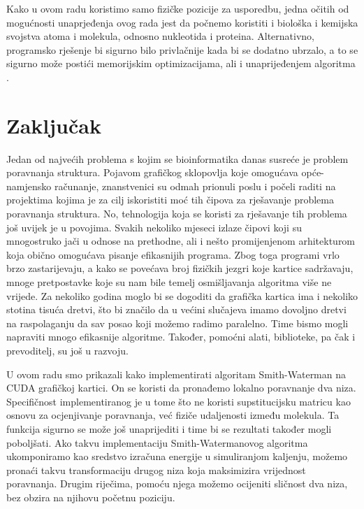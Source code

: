 \documentclass[times, utf8, zavrsni]{fer}
\begin{document}
Kako u ovom radu koristimo samo fizičke pozicije za usporedbu,
jedna očitih od mogućnosti unaprjeđenja ovog rada jest da počnemo
koristiti i biološka i kemijska svojstva atoma i molekula, odnosno
nukleotida i proteina. Alternativno, programsko rješenje bi sigurno
bilo privlačnije kada bi se dodatno ubrzalo, a to se sigurno može
postići memorijskim optimizacijama, ali i unaprijeđenjem algoritma .




\chapter{Zaključak}
\label{chapter:Zakljucak}
Jedan od najvećih problema s kojim se bioinformatika danas
susreće je problem poravnanja struktura. Pojavom grafičkog sklopovlja
koje omogućava opće-namjensko računanje, znanstvenici su odmah
prionuli poslu i počeli raditi na projektima kojima je za cilj
iskoristiti moć tih čipova za rješavanje problema poravnanja
struktura. No, tehnologija koja se koristi za rješavanje tih problema
još uvijek je u povojima. Svakih nekoliko mjeseci izlaze
čipovi koji su mnogostruko jači u odnose na prethodne, ali i
nešto promijenjenom arhitekturom koja obično omogućava pisanje
efikasnijih programa. Zbog toga programi vrlo brzo zastarijevaju,
a kako se povećava broj fizičkih jezgri koje kartice sadržavaju,
mnoge pretpostavke koje su nam bile temelj osmišljavanja algoritma
više ne vrijede. Za nekoliko godina moglo bi se dogoditi da grafička
kartica ima i nekoliko stotina tisuća dretvi, što bi značilo
da u većini slučajeva imamo dovoljno dretvi na raspolaganju
da sav posao koji možemo radimo paralelno. Time bismo mogli
napraviti mnogo efikasnije algoritme. Također, pomoćni alati,
biblioteke, pa čak i prevoditelj, su još u razvoju. 

U ovom radu smo prikazali kako implementirati algoritam Smith-Waterman
na CUDA grafičkoj kartici. On se koristi da pronađemo lokalno
poravnanje dva niza. Specifičnost implementiranog je u tome što
ne koristi supstitucijsku matricu kao osnovu za ocjenjivanje
poravnanja, već fiziče udaljenosti između molekula. Ta funkcija
sigurno se može još unaprijediti i time bi se rezultati također
mogli poboljšati. Ako takvu implementaciju Smith-Watermanovog algoritma
ukomponiramo kao sredstvo izračuna energije u simuliranjom
ka{\-}lje{\-}nju,
možemo pronaći takvu transformaciju
drugog niza koja maksimizira vrijednost poravnanja. Drugim riječima,
pomoću njega možemo ocijeniti sličnost dva niza, bez obzira na 
njihovu početnu poziciju. 
\end{document}
